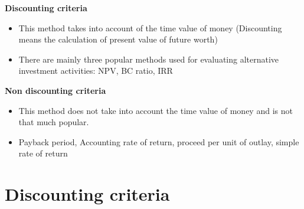 \documentclass[12pt,ignorenonframetext,aspectratio=169]{beamer}
\providecommand{\tightlist}{%
  \setlength{\itemsep}{0pt}\setlength{\parskip}{0pt}}
\begin{document}
\begin{frame}{}
\protect\hypertarget{section-6}{}
\textbf{Discounting criteria}

\begin{itemize}
\tightlist
\item
  This method takes into account of the time value of money (Discounting
  means the calculation of present value of future worth)
\item
  There are mainly three popular methods used for evaluating alternative
  investment activities: NPV, BC ratio, IRR
\end{itemize}

\textbf{Non discounting criteria}

\begin{itemize}
\tightlist
\item
  This method does not take into account the time value of money and is
  not that much popular.
\item
  Payback period, Accounting rate of return, proceed per unit of outlay,
  simple rate of return
\end{itemize}
\end{frame}

\hypertarget{discounting-criteria}{%
\section{Discounting criteria}\label{discounting-criteria}}
\end{document}
